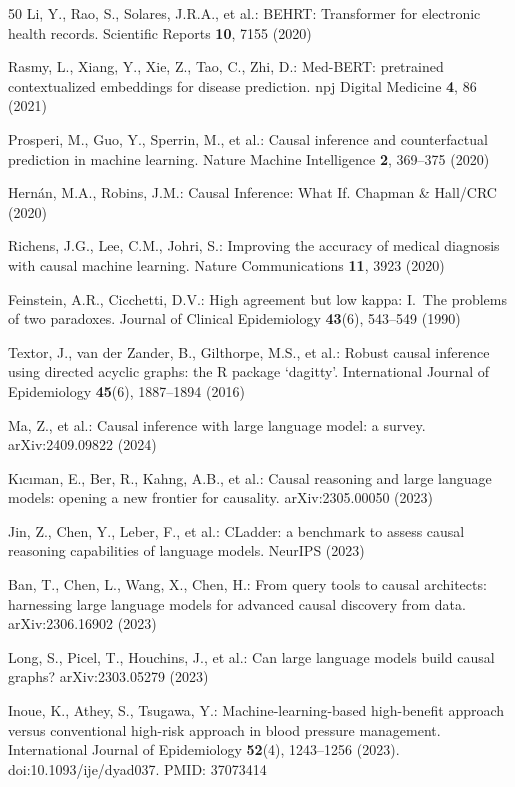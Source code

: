 \documentclass[runningheads]{llncs}
\begin{document}
\begin{thebibliography}{50}
Li, Y., Rao, S., Solares, J.R.A., et al.:
BEHRT: Transformer for electronic health records.
Scientific Reports \textbf{10}, 7155 (2020)

Rasmy, L., Xiang, Y., Xie, Z., Tao, C., Zhi, D.:
Med-BERT: pretrained contextualized embeddings for disease prediction.
npj Digital Medicine \textbf{4}, 86 (2021)

Prosperi, M., Guo, Y., Sperrin, M., et al.:
Causal inference and counterfactual prediction in machine learning.
Nature Machine Intelligence \textbf{2}, 369--375 (2020)

Hern\'{a}n, M.A., Robins, J.M.:
Causal Inference: What If.
Chapman \& Hall/CRC (2020)

Richens, J.G., Lee, C.M., Johri, S.:
Improving the accuracy of medical diagnosis with causal machine learning.
Nature Communications \textbf{11}, 3923 (2020)

Feinstein, A.R., Cicchetti, D.V.:
High agreement but low kappa: I.\ The problems of two paradoxes.
Journal of Clinical Epidemiology \textbf{43}(6), 543--549 (1990)

Textor, J., van der Zander, B., Gilthorpe, M.S., et al.:
Robust causal inference using directed acyclic graphs: the R package `dagitty'.
International Journal of Epidemiology \textbf{45}(6), 1887--1894 (2016)

Ma, Z., et al.:
Causal inference with large language model: a survey.
arXiv:2409.09822 (2024)

K{\i}c{\i}man, E., Ber, R., Kahng, A.B., et al.:
Causal reasoning and large language models: opening a new frontier
for causality.
arXiv:2305.00050 (2023)

Jin, Z., Chen, Y., Leber, F., et al.:
CLadder: a benchmark to assess causal reasoning capabilities of
language models.
NeurIPS (2023)

Ban, T., Chen, L., Wang, X., Chen, H.:
From query tools to causal architects: harnessing large language
models for advanced causal discovery from data.
arXiv:2306.16902 (2023)

Long, S., Picel, T., Houchins, J., et al.:
Can large language models build causal graphs?
arXiv:2303.05279 (2023)

Inoue, K., Athey, S., Tsugawa, Y.:
Machine-learning-based high-benefit approach versus
conventional high-risk approach in blood pressure management.
International Journal of Epidemiology \textbf{52}(4), 1243--1256 (2023).
doi:10.1093/ije/dyad037. PMID: 37073414


\end{thebibliography}
\end{document}
